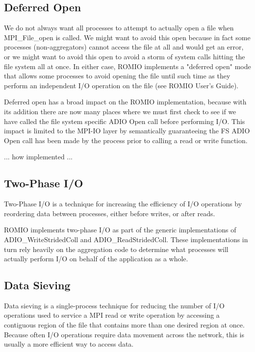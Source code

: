\subsection{Deferred Open}

We do not always want all processes to attempt to actually open a file when
MPI\_File\_open is called.  We might want to avoid this open because in fact
some processes (non-aggregators) cannot access the file at all and would get
an error, or we might want to avoid this open to avoid a storm of system calls
hitting the file system all at once.  In either case, ROMIO implements a
"deferred open" mode that allows some processes to avoid opening the file
until such time as they perform an independent I/O operation on the file (see
ROMIO User's Guide).

Deferred open has a broad impact on the ROMIO implementation, because with its
addition there are now many places where we must first check to see if we have
called the file system specific ADIO Open call before performing I/O.  This
impact is limited to the MPI-IO layer by semantically guaranteeing the FS ADIO
Open call has been made by the process prior to calling a read or write
function.

... how implemented ...

\subsection{Two-Phase I/O}

Two-Phase I/O is a technique for increasing the efficiency of I/O operations
by reordering data between processes, either before writes, or after reads.

ROMIO implements two-phase I/O as part of the generic implementations of
ADIO\_WriteStridedColl and ADIO\_ReadStridedColl.  These implementations in turn
rely heavily on the aggregation code to determine what processes will actually
perform I/O on behalf of the application as a whole.



\subsection{Data Sieving}

Data sieving is a single-process technique for reducing the number of I/O
operations used to service a MPI read or write operation by accessing a
contiguous region of the file that contains more than one desired region at
once.  Because often I/O operations require data movement across the network,
this is usually a more efficient way to access data.

